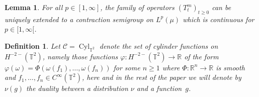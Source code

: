 \documentclass[10pt]{article}
\newcommand{\tmop}[1]{\ensuremath{\operatorname{#1}}}
\newtheorem{definition}{Definition}
\newtheorem{lemma}{Lemma}
\begin{document}
\begin{lemma}
  \label{lem:semigroup}For all $p \in [1, \infty]$, the family of operators
  $(T^m_t)_{t \geqslant 0}$ can be uniquely extended to a contraction
  semigroup on $L^p (\mu)$ which is continuous for $p \in [1, \infty [$.
\end{lemma}

\begin{definition}
  \label{def:cylfn}Let $\mathcal{C}= \tmop{Cyl}_{\mathbb{T}^2}$ denote the set
  of cylinder functions on $H^{- 2 -} (\mathbb{T}^2)$, namely those functions
  $\varphi : H^{- 2 -} (\mathbb{T}^2) \rightarrow \mathbb{R}$ of the form
  $\varphi (\omega) = \Phi (\omega (f_1), \ldots, \omega (f_n))$ for some $n
  \geqslant 1$ where $\Phi : \mathbb{R}^n \rightarrow \mathbb{R}$ is smooth
  and $f_1, \ldots, f_n \in C^{\infty} (\mathbb{T}^2)$, here and in the rest
  of the paper we will denote by $\nu (g)$ the duality between a distribution
  $\nu$ and a function~$g$.
\end{definition}
\end{document}
